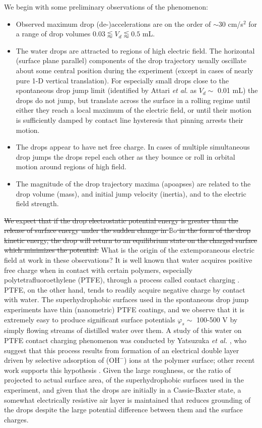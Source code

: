 \documentclass[aip,reprint, floatfix]{revtex4-1}
\begin{document}
We begin with some preliminary observations of the phenomenon:
\begin{itemize}
\item Observed maximum drop (de-)accelerations are on the order of $\sim$30 cm/s$^2$ for a range of drop volumes $0.03 \lessapprox V_d \lessapprox 0.5$ mL.
\item The water drops are attracted to regions of high electric field. The horizontal (surface plane parallel) components of the drop trajectory usually oscillate about some central position during the experiment (except in cases of nearly pure 1-D vertical translation). For especially small drops close to the spontaneous drop jump limit (identified by Attari \emph{et al.} \citep{attari_puddle_2016} as $V_d \sim$ 0.01 mL) the drops do not jump, but translate across the surface in a rolling regime until either they reach a local maximum of the electric field, or until their motion is sufficiently damped by contact line hysteresis that pinning arrests their motion.
\item The drops appear to have net free charge. In cases of multiple simultaneous drop jumps the drops repel each other as they bounce or roll in orbital motion around regions of high field.
\item The magnitude of the drop trajectory maxima (apoapses) are related to the drop volume (mass), and initial jump velocity (inertia), and to the electric field strength.
\end{itemize}

\sout{We expect that if the drop electrostatic potential energy is greater than the release of surface energy under the sudden change in $\mathbb{B}\mbox{o}$ in the form of the drop kinetic energy, the drop will return to an equilibrium state on the charged surface which minimizes the potential.}
What is the origin of the extemporaneous electric field at work in these observations? It is well known that water acquires positive free charge when in contact with certain polymers, especially polytetrafluoroethylene (PTFE), through a process called contact charging \cite{langmuir_surface_1938}. PTFE, on the other hand, tends to readily acquire negative charge by contact with water. The superhydrophobic surfaces used in the spontaneous drop jump experiments have thin (nanometric) PTFE coatings, and we observe that it is extremely easy to produce significant surface potentials $\varphi_s \sim$ 100-500 V by simply flowing streams of distilled water over them. A study of this water on PTFE contact charging phenomenon was conducted by Yatsuzuka \emph{et al.} \cite{yatsuzuka_electrification_1994}, who suggest that this process results from formation of an electrical double layer driven by selective adsorption of ($\mbox{OH}^-$) ions at the polymer surface; other recent work supports this hypothesis \cite{beattie_intrinsic_2006, strazdaite_water_2015}. Given the large roughness, or the ratio of projected to actual surface area, of the superhydrophobic surfaces used in the experiment, and given that the drops are initially in a Cassie-Baxter state, a somewhat electrically resistive air layer is maintained that reduces grounding of the drops despite the large potential difference between them and the surface charges.
\end{document}
